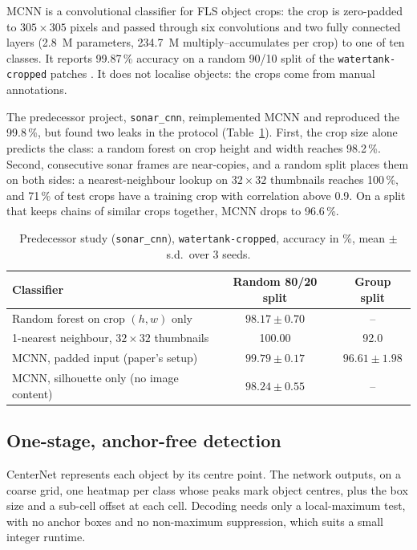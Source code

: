 \documentclass[11pt,a4paper]{article}
\begin{document}
MCNN \cite{cimen} is a convolutional classifier for FLS object crops: the
crop is zero-padded to $305 \times 305$ pixels and passed through six
convolutions and two fully connected layers (2.8~M parameters, 234.7~M
multiply--accumulates per crop) to one of ten classes. It reports 99.87\,\%
accuracy on a random 90/10 split of the \texttt{watertank-cropped} patches
\cite{valdenegro2025}. It does not localise objects: the crops come from
manual annotations.

The predecessor project, \texttt{sonar\_cnn}, reimplemented MCNN and
reproduced the 99.8\,\%, but found two leaks in the protocol
(Table~\ref{tab:predecessor}). First, the crop size alone predicts the
class: a random forest on crop height and width reaches 98.2\,\%. Second,
consecutive sonar frames are near-copies, and a random split places them on
both sides: a nearest-neighbour lookup on $32 \times 32$ thumbnails reaches
100\,\%, and 71\,\% of test crops have a training crop with correlation
above 0.9. On a split that keeps chains of similar crops together, MCNN
drops to 96.6\,\%.

\begin{table}[H]
\centering
\caption{Predecessor study (\texttt{sonar\_cnn}), \texttt{watertank-cropped},
accuracy in \%, mean $\pm$ s.d.\ over 3 seeds.}
\label{tab:predecessor}
\begin{tabular}{lcc}
\toprule
Classifier & Random 80/20 split & Group split \\
\midrule
Random forest on crop $(h, w)$ only & $98.17 \pm 0.70$ & -- \\
1-nearest neighbour, $32 \times 32$ thumbnails & 100.00 & 92.0 \\
MCNN, padded input (paper's setup) & $99.79 \pm 0.17$ & $96.61 \pm 1.98$ \\
MCNN, silhouette only (no image content) & $98.24 \pm 0.55$ & -- \\
\bottomrule
\end{tabular}
\end{table}

\subsection{One-stage, anchor-free detection}

CenterNet \cite{zhou2019} represents each object by its centre point. The
network outputs, on a coarse grid, one heatmap per class whose peaks mark
object centres, plus the box size and a sub-cell offset at each cell.
Decoding needs only a local-maximum test, with no anchor boxes and no
non-maximum suppression, which suits a small integer runtime.
\end{document}
